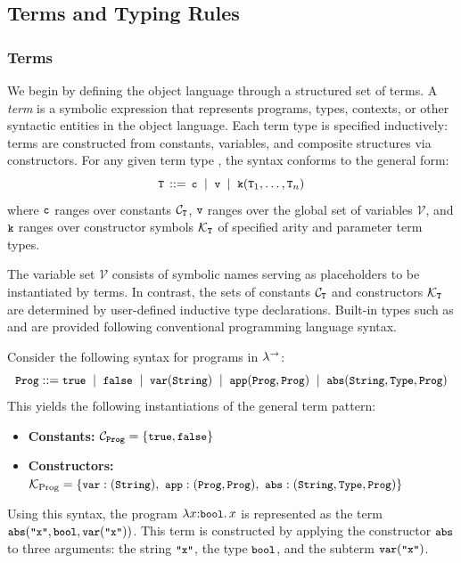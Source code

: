 \subsection{Terms and Typing Rules}
\subsubsection{Terms}
\label{terms-intro}
We begin by defining the object language through a structured set of terms. A \emph{term} is a symbolic expression that represents programs, types, contexts, or other syntactic entities in the object language. Each term type is specified inductively: terms are constructed from constants, variables, and composite structures via constructors. For any given term type , the syntax conforms to the general form:
\[\tcode{T} \,::=\, \tcode{c} \;\mid\; \tcode{v} \;\mid\; \tcode{k}(\tcode{T}_1, \ldots, \tcode{T}_n)\]
where \(\tcode{c}\) ranges over constants \(\mathcal{C}_\scode{T}\), \(\tcode{v}\) ranges over the global set of variables \(\mathcal{V}\), and \(\tcode{k}\) ranges over constructor symbols \(\mathcal{K}_\scode{T}\) of specified arity and parameter term types. 

The variable set $\mathcal{V}$ consists of symbolic names serving as placeholders to be instantiated by terms. In contrast, the sets of constants $\mathcal{C}_\scode{T}$ and constructors $\mathcal{K}_\scode{T}$ are determined by user-defined inductive type declarations. 
Built-in types such as  and  are provided following conventional programming language syntax.

\begin{example}
Consider the following syntax for programs in $\lambda^{\rightarrow}$:
\[
\tcode{Prog} ::= 
  \tcode{true} \;\mid\;
  \tcode{false} \;\mid\;
  \tcode{var}(\tcode{String}) \;\mid\;
  \tcode{app}(\tcode{Prog}, \tcode{Prog}) \;\mid\;
  \tcode{abs}(\tcode{String}, \tcode{Type}, \tcode{Prog})
\]
This yields the following instantiations of the general term pattern:
\begin{itemize}
  \item \textbf{Constants:} \(\mathcal{C}_{\tcode{Prog}} = \{\tcode{true}, \tcode{false}\}\)
  \item \textbf{Constructors:}
    \(\mathcal{K}_{\text{Prog}} = \{
      \tcode{var} : (\tcode{String}),\ 
      \tcode{app} : (\tcode{Prog}, \tcode{Prog}),\ 
      \tcode{abs} : (\tcode{String}, \tcode{Type}, \tcode{Prog})
    \}\)
\end{itemize}
Using this syntax, the program $\lambda x{:}\tcode{bool}.\, x$ is represented as the term $\tcode{abs}(\tcode{"x"}, \tcode{bool}, \tcode{var}(\tcode{"x"}))$. This term is constructed by applying the constructor $\tcode{abs}$ to three arguments: the string $\tcode{"x"}$, the type $\tcode{bool}$, and the subterm $\tcode{var}(\tcode{"x"})$.
\end{example}

